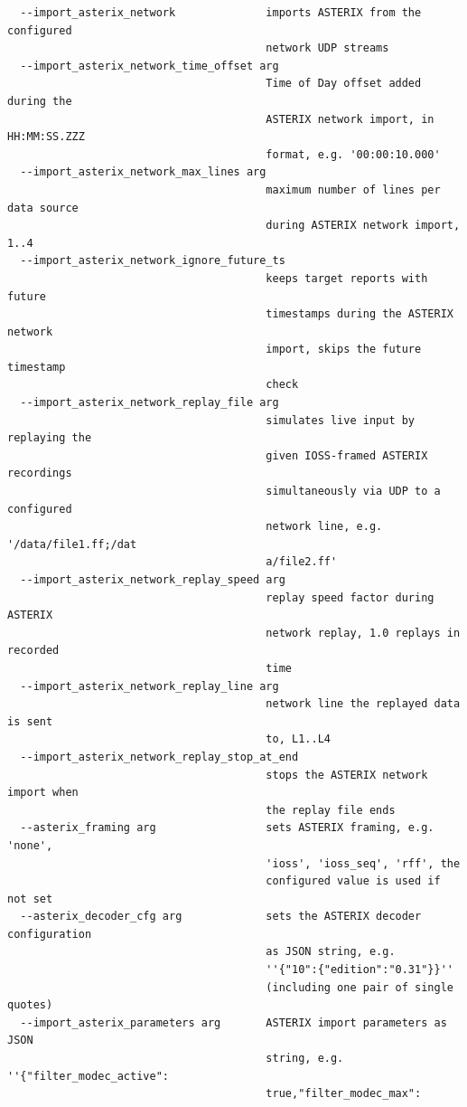\begin{lstlisting}
  --import_asterix_network              imports ASTERIX from the configured
                                        network UDP streams
  --import_asterix_network_time_offset arg
                                        Time of Day offset added during the
                                        ASTERIX network import, in HH:MM:SS.ZZZ
                                        format, e.g. '00:00:10.000'
  --import_asterix_network_max_lines arg
                                        maximum number of lines per data source
                                        during ASTERIX network import, 1..4
  --import_asterix_network_ignore_future_ts
                                        keeps target reports with future
                                        timestamps during the ASTERIX network
                                        import, skips the future timestamp
                                        check
  --import_asterix_network_replay_file arg
                                        simulates live input by replaying the
                                        given IOSS-framed ASTERIX recordings
                                        simultaneously via UDP to a configured
                                        network line, e.g. '/data/file1.ff;/dat
                                        a/file2.ff'
  --import_asterix_network_replay_speed arg
                                        replay speed factor during ASTERIX
                                        network replay, 1.0 replays in recorded
                                        time
  --import_asterix_network_replay_line arg
                                        network line the replayed data is sent
                                        to, L1..L4
  --import_asterix_network_replay_stop_at_end
                                        stops the ASTERIX network import when
                                        the replay file ends
  --asterix_framing arg                 sets ASTERIX framing, e.g. 'none',
                                        'ioss', 'ioss_seq', 'rff', the
                                        configured value is used if not set
  --asterix_decoder_cfg arg             sets the ASTERIX decoder configuration
                                        as JSON string, e.g.
                                        ''{"10":{"edition":"0.31"}}''
                                        (including one pair of single quotes)
  --import_asterix_parameters arg       ASTERIX import parameters as JSON
                                        string, e.g. ''{"filter_modec_active":
                                        true,"filter_modec_max":

\end{lstlisting}

